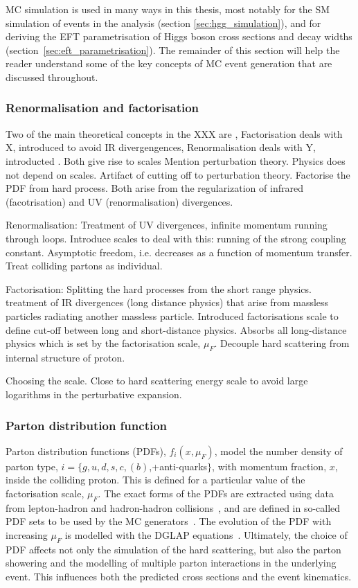 MC simulation is used in many ways in this thesis, most notably for the SM simulation of events in the \Hgg analysis (section \ref{sec:hgg_simulation}), and for deriving the EFT parametrisation of Higgs boson cross sections and decay widths (section~\ref{sec:eft_parametrisation}). The remainder of this section will help the reader understand some of the key concepts of MC event generation that are discussed throughout.

\subsubsection{Renormalisation and factorisation}

Two of the main theoretical concepts in the XXX are , Factorisation deals with X, introduced to avoid IR divergengences, Renormalisation deals with Y, introducted . Both give rise to scales
Mention perturbation theory. Physics does not depend on scales. Artifact of cutting off to perturbation theory. Factorise the PDF from hard process.
Both arise from the regularization of infrared (facotrisation) and UV (renormalisation) divergences.

Renormalisation: Treatment of UV divergences, infinite momentum running through loops.
Introduce scales to deal with this: running of the strong coupling constant. Asymptotic freedom, i.e. decreases as a function of momentum transfer. Treat colliding partons as individual.

Factorisation: Splitting the hard processes from the short range physics. treatment of IR divergences (long distance physics) that arise from massless particles radiating another massless particle.  Introduced factorisations scale to define cut-off between long and short-distance physics. Absorbs all long-distance physics which is set by the factorisation scale, $\mu_F$. Decouple hard scattering from internal structure of proton. 

Choosing the scale. Close to hard scattering energy scale to avoid large logarithms in the perturbative expansion.

\subsubsection{Parton distribution function}
Parton distribution functions (PDFs), $f_{i}(x,\mu_F)$, model the number density of parton type, $i=\{g,u,d,s,c,(b)$,+anti-quarks$\}$, with momentum fraction, $x$, inside the colliding proton. This is defined for a particular value of the factorisation scale, $\mu_F$. The exact forms of the PDFs are extracted using data from lepton-hadron and hadron-hadron collisions~\cite{}, and are defined in so-called PDF sets to be used by the MC generators~\cite{}. The evolution of the PDF with increasing $\mu_F$ is modelled with the DGLAP equations~\cite{}. Ultimately, the choice of PDF affects not only the simulation of the hard scattering, but also the parton showering and the modelling of multiple parton interactions in the underlying event. This influences both the predicted cross sections and the event kinematics.

